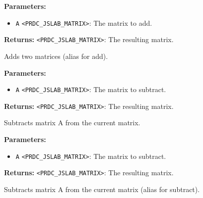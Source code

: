 \documentclass[12pt,a4paper]{article}
\begin{document}
\vspace{5mm}
\noindent {}


\noindent \textbf{Parameters:}
\begin{itemize}
  \item \texttt{A} \texttt{<PRDC\_JSLAB\_MATRIX>}: The matrix to add.
\end{itemize}

\noindent \textbf{Returns:} \texttt{<PRDC\_JSLAB\_MATRIX>}: The resulting matrix.

\noindent Adds two matrices (alias for add).

\vspace{5mm}
\noindent {}


\noindent \textbf{Parameters:}
\begin{itemize}
  \item \texttt{A} \texttt{<PRDC\_JSLAB\_MATRIX>}: The matrix to subtract.
\end{itemize}

\noindent \textbf{Returns:} \texttt{<PRDC\_JSLAB\_MATRIX>}: The resulting matrix.

\noindent Subtracts matrix A from the current matrix.

\vspace{5mm}
\noindent {}


\noindent \textbf{Parameters:}
\begin{itemize}
  \item \texttt{A} \texttt{<PRDC\_JSLAB\_MATRIX>}: The matrix to subtract.
\end{itemize}

\noindent \textbf{Returns:} \texttt{<PRDC\_JSLAB\_MATRIX>}: The resulting matrix.

\noindent Subtracts matrix A from the current matrix (alias for subtract).

\vspace{5mm}
\noindent {}
\end{document}
